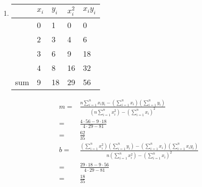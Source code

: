 \documentclass[12pt,letterpaper]{hmcpset}
\begin{document}
\begin{solution}
    \begin{enumerate}
      \item
      \begin{tabular}{l|l|l|| l| l }
        & $x_i$ & $y_i$ & $x_i^2$ & $x_iy_i$\\
        \hline
        &0 & 1 & 0 & 0\\
        &2 & 3 & 4 & 6 \\
        &3 & 6 & 9 & 18 \\
        &4 & 8 & 16 & 32\\
        \hline
        sum & 9 & 18 & 29 & 56
      \end{tabular}
      \begin{align*}
        m =& \frac{n \sum_{i=1}^n x_iy_i  - \left(\sum_{i=1}^n x_i\right) \left(\sum_{i=1}^n y_i\right) }{ \left(n\sum_{i=1}^n x_i^2 \right) - \left(\sum_{i=1}^n x_i \right)^2}\\
        =& \frac{4\cdot 56 - 9\cdot 18}{ 4 \cdot 29 -  81}\\
      =& \boxed{\frac{62}{35}}\\
        b =& \frac{\left(\sum_{i=1}^n x_i^2\right) \left( \sum_{i=1}^n  y_i\right)
        - \left(\sum_{i=1}^n x_i\right)\left(\sum_{i=1}^n x_iy_i\right)}{
        n\left(\sum_{i=1}^n x_i^2\right)- \left(\sum_{i=1}^n x_i\right)^2}\\
        =& \frac{ 29\cdot 18 - 9\cdot 56 }{4\cdot 29 - 81}\\
      =&\boxed{\frac{18}{35}}
      \end{align*}


\end{enumerate}
\end{solution}
\end{document}
